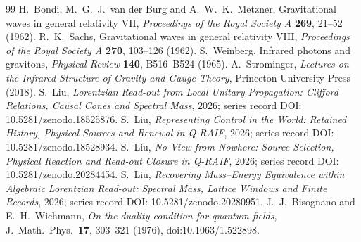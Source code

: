 \documentclass[12pt,a4paper]{article}
\theoremstyle{definition}
\begin{document}
\begin{thebibliography}{99}
 H.~Bondi, M.~G.~J.~van der Burg and A.~W.~K.~Metzner,
Gravitational waves in general relativity VII,
\emph{Proceedings of the Royal Society A} \textbf{269}, 21--52 (1962).
 R.~K.~Sachs, Gravitational waves in general relativity VIII,
\emph{Proceedings of the Royal Society A} \textbf{270}, 103--126 (1962).
 S.~Weinberg, Infrared photons and gravitons,
\emph{Physical Review} \textbf{140}, B516--B524 (1965).
 A.~Strominger,
\emph{Lectures on the Infrared Structure of Gravity and Gauge Theory}, Princeton University Press (2018).
 S.~Liu,
\emph{Lorentzian Read-out from Local Unitary Propagation: Clifford Relations, Causal Cones and Spectral Mass},
2026; series record DOI: 10.5281/zenodo.18525876.
 S.~Liu,
\emph{Representing Control in the World: Retained History, Physical Sources and Renewal in Q-RAIF},
2026; series record DOI: 10.5281/zenodo.18528934.
 S.~Liu,
\emph{No View from Nowhere: Source Selection, Physical Reaction and Read-out Closure in Q-RAIF},
2026; series record DOI: 10.5281/zenodo.20284454.
 S.~Liu,
\emph{Recovering Mass--Energy Equivalence within Algebraic Lorentzian Read-out: Spectral Mass, Lattice Windows and Finite Records},
2026; series record DOI: 10.5281/zenodo.20280951.
J.~J.~Bisognano and E.~H.~Wichmann, \emph{On the duality condition for quantum fields}, J.\ Math.\ Phys.\ \textbf{17}, 303--321 (1976), doi:10.1063/1.522898.

\end{thebibliography}
\end{document}
